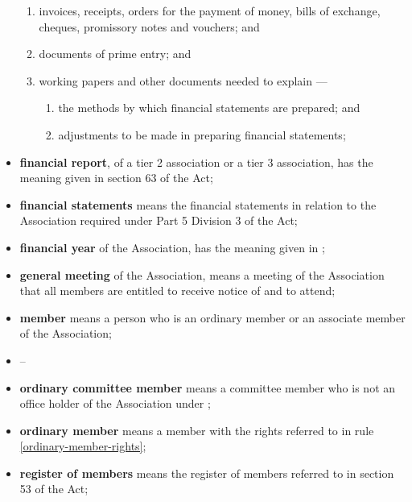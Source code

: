 \documentclass[../constitution.tex]{subfiles}
\begin{document}
\begin{itemize}[label={-}]
\begin{enumerate}
  \item invoices, receipts, orders for the payment of money, bills of exchange, cheques, promissory notes and vouchers; and
  \item documents of prime entry; and
  \item working papers and other documents needed to explain ---
    \begin{enumerate}
    \def\labelenumi{\roman{enumi})}
    \setcounter{enumi}{0}
    \item the methods by which financial statements are prepared; and
    \item adjustments to be made in preparing financial statements; 
    \end{enumerate}
  \end{enumerate}
\item \textbf{financial report}, of a tier 2 association or a tier 3 association, has the meaning given in section 63 of the Act;
\item \textbf{financial statements} means the financial statements in relation to the Association required under Part 5 Division 3 of the Act;
\item \textbf{financial year}\chadded[id=proofing]{,} of the Association, has the meaning given in ;
\item \textbf{general meeting}\chadded[id=proofing]{,} of the Association, means a meeting of the Association that all members are entitled to receive notice of and to attend;
\item \textbf{member} means a person  who is an ordinary member or an associate member of the Association;
\item \textbf{} --  
\item \textbf{ordinary committee member} means a committee member who is not an office holder of the Association under ;
\item \textbf{ordinary member} means a member with the rights referred to in rule \ref{ordinary-member-rights};
\item \textbf{register of members} means the register of members referred to in section 53 of the Act;

\end{itemize}
\end{document}
